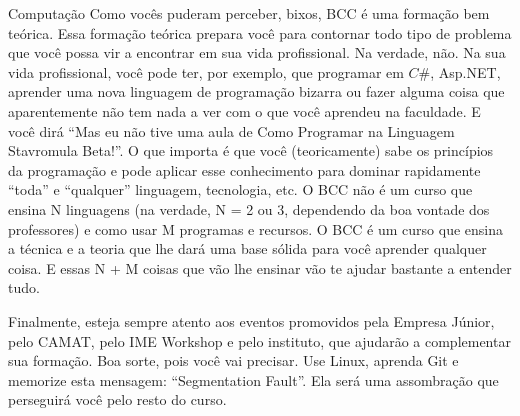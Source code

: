 \begin{subsecao}{Computação}
Como vocês puderam perceber, bixos, BCC é uma formação bem teórica. Essa
formação teórica prepara você para contornar todo tipo de problema que você
possa vir a encontrar em sua vida profissional. Na verdade, não. Na sua vida
profissional, você pode ter, por exemplo, que programar em $C\#$, Asp.NET,
aprender uma nova linguagem de programação bizarra ou fazer alguma coisa que
aparentemente não tem nada a ver com o que você aprendeu na faculdade. E você
dirá ``Mas eu não tive uma aula de Como Programar na Linguagem Stavromula
Beta!''. O que importa é que você (teoricamente) sabe os princípios da
programação e pode aplicar esse conhecimento para dominar rapidamente ``toda'' e
``qualquer'' linguagem, tecnologia, etc. O BCC não é um curso que ensina N
linguagens (na verdade, N = 2 ou 3, dependendo da boa vontade dos professores) e
como usar M programas e recursos. O BCC é um curso que ensina a técnica e a
teoria que lhe dará uma base sólida para você aprender qualquer coisa. E essas N
+ M coisas que vão lhe ensinar vão te ajudar bastante a entender tudo.

Finalmente, esteja sempre atento aos eventos promovidos pela Empresa Júnior,
pelo CAMAT, pelo IME Workshop e pelo instituto, que ajudarão a complementar sua
formação. Boa sorte, pois você vai precisar. Use Linux, aprenda Git e memorize esta
mensagem: ``Segmentation Fault''. Ela será uma assombração que perseguirá você
pelo resto do curso.

\end{subsecao}
